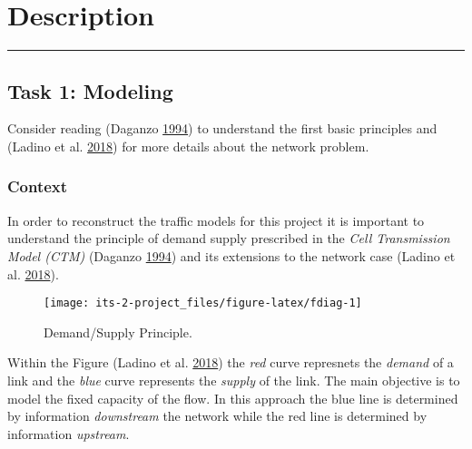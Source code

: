 \documentclass[]{book}
\theoremstyle{definition}
\theoremstyle{definition}
\theoremstyle{definition}
\theoremstyle{remark}
\begin{document}
\hypertarget{description-2}{%
\section*{Description}\label{description-2}}

\begin{center}\rule{0.5\linewidth}{\linethickness}\end{center}

\hypertarget{task-1-modeling-1}{%
\subsection*{Task 1: Modeling}\label{task-1-modeling-1}}

Consider reading (Daganzo
\protect\hyperlink{ref-Daganzo1994:TR-B}{1994}) to understand the first
basic principles and (Ladino et al.
\protect\hyperlink{ref-Ladino2018}{2018}) for more details about the
network problem.

\hypertarget{context-9}{%
\subsubsection*{Context}\label{context-9}}

In order to reconstruct the traffic models for this project it is
important to understand the principle of demand supply prescribed in the
\emph{Cell Transmission Model (CTM)} (Daganzo
\protect\hyperlink{ref-Daganzo1994:TR-B}{1994}) and its extensions to
the network case (Ladino et al.
\protect\hyperlink{ref-Ladino2018}{2018}).



\begin{figure}

{\centering \texttt{[image: its-2-project\_files/figure-latex/fdiag-1]} 

}

\caption{Demand/Supply Principle.}\label{fig:fdiag}
\end{figure}

Within the Figure (Ladino et al.
\protect\hyperlink{ref-Ladino2018}{2018}) the \emph{red} curve
represnets the \emph{demand} of a link and the \emph{blue} curve
represents the \emph{supply} of the link. The main objective is to model
the fixed capacity of the flow. In this approach the blue line is
determined by information \emph{downstream} the network while the red
line is determined by information \emph{upstream}.
\end{document}
